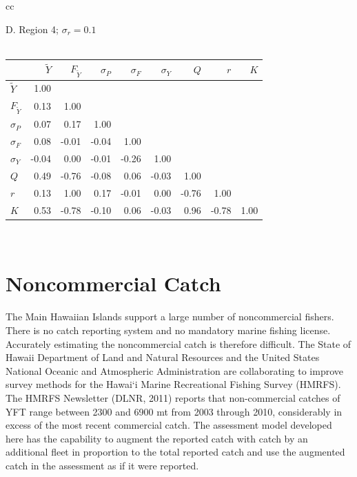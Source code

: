 \documentclass[12pt,letterpaper]{article}
\newcommand\MSY{\widetilde{Y}}
\newcommand\Fmsy{F_{\MSY}}
\begin{document}
\begin{table}
\begin{tabular}[h]{cc}
\begin{minipage}[t]{0.5\textwidth}
\begin{center}
{\Large D. Region 4; $\sigma_r = 0.1$}\\
~\\
\begin{tabular}{|lrrrrrrrr|}
\hline
&$\MSY$&$\Fmsy$&$\sigma_P$&$\sigma_F$&$\sigma_Y$&$Q$&$r$&$K$\\
\hline
$\MSY$&1.00&&&&&&&\\
$\Fmsy$&0.13&1.00&&&&&&\\
$\sigma_P$&0.07&0.17&1.00&&&&&\\
$\sigma_F$&0.08&-0.01&-0.04&1.00&&&&\\
$\sigma_Y$&-0.04&0.00&-0.01&-0.26&1.00&&&\\
$Q$&0.49&-0.76&-0.08&0.06&-0.03&1.00&&\\
$r$&0.13&1.00&0.17&-0.01&0.00&-0.76&1.00&\\
$K$&0.53&-0.78&-0.10&0.06&-0.03&0.96&-0.78&1.00\\
\hline
\end{tabular}
\end{center}
      \end{minipage}\\
   \end{tabular}%
\end{table}


\clearpage
\section{Noncommercial Catch}
\label{sec:klingon}
The Main Hawaiian Islands support a large number of noncommercial
fishers. There is no catch reporting system and no mandatory marine fishing
license. 
Accurately estimating the noncommercial catch is therefore difficult. 
The State of Hawaii Department of Land and Natural Resources and the
United States National Oceanic and Atmospheric Administration are  
collaborating to improve survey methods for the Hawai`i Marine
Recreational Fishing Survey (HMRFS). The HMRFS Newsletter (DLNR, 2011)
reports that non-commercial catches of YFT range between 2300 and 6900
mt from 2003 through 2010, considerably in excess of the most recent
commercial catch. The assessment model developed here has the capability to
augment the reported catch with catch by an additional fleet in
proportion to the total reported catch and use the augmented catch in
the assessment as if it were reported.
\end{document}
